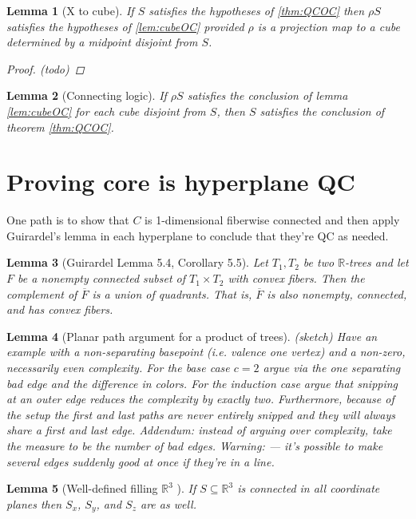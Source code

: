\documentclass{article}
\theoremstyle{mystyle}
\newtheorem{lem}{Lemma}[section]
\theoremstyle{remark}
\begin{document}
\begin{lem}
	[\label{lem:Xtocube}X to cube]
	If \(S\) satisfies the hypotheses of \ref{thm:QCOC} then \(\rho S\) satisfies the hypotheses of \ref{lem:cubeOC} provided \(\rho\) is a projection map to a cube determined by a midpoint disjoint from \(S\).
\begin{proof}
	(todo)	
\end{proof}
\end{lem}

\begin{lem}
	[Connecting logic]
	If \(\rho S\) satisfies the conclusion of lemma \ref{lem:cubeOC} for each cube disjoint from \(S\), then \(S\) satisfies the conclusion of theorem \ref{thm:QCOC}.
\end{lem}


\section{Proving core is hyperplane QC}
One path is to show that \(C\) is 1-dimensional fiberwise connected and then apply Guirardel's lemma in each hyperplane to conclude that they're QC as needed.

\begin{lem}
	[Guirardel Lemma 5.4, Corollary 5.5]
	Let \(T_{1} , T_{2}\) be two \(\mathbb{R}\)-trees and let \(F\) be a nonempty connected subset of \(T_{1} \times T_{2}\) with convex fibers. Then the complement of \(\overline{F}\) is a union of quadrants. That is, \(\overline{F}\) is also nonempty, connected, and has convex fibers.
\end{lem}

\begin{lem}
	[Planar path argument for a product of trees]
	(sketch)
	Have an example with a non-separating basepoint (i.e. valence one vertex) and a non-zero, necessarily even complexity. For the base case \(c=2\) argue via the one separating bad edge and the difference in colors. For the induction case argue that snipping at an outer edge reduces the complexity by exactly two. Furthermore, because of the setup the first and last paths are never entirely snipped and they will always share a first and last edge.
	Addendum: instead of arguing over complexity, take the measure to be the number of bad edges.
	Warning: --- it's possible to make several edges suddenly good at once if they're in a line.

\end{lem}

\begin{lem}
	[Well-defined filling \(\mathbb{R}^{3}\) ]

	If \(S \subseteq \mathbb{R}^{3}\) is connected in all coordinate planes then \(S_x\), \(S_{y}\), and \(S_{z}\) are as well. 
	

\end{lem}
\end{document}
